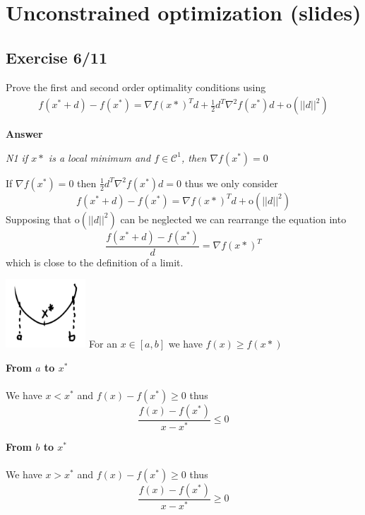\section{Unconstrained optimization (slides)}
\subsection{Exercise 6/11}
Prove the first and second order optimality conditions using
\begin{align*}
f(x^* + d) - f(x^*) = \nabla f(x*)^T d + \frac{1}{2} d^T \nabla^2 f(x^*)d + \text{o}(||d||^2)
\end{align*}

\textbf{Answer}

\hspace{0.5in} \textit{N1 if $x*$ is a local minimum and $f\in \mathcal{C}^1$, then $\nabla f(x^*) = 0$}

If $\nabla f(x^*) = 0$ then $\frac{1}{2} d^T \nabla^2 f(x^*)d = 0$ thus we only consider
\[
f(x^* + d) - f(x^*) = \nabla f(x*)^T d + \text{o}(||d||^2)
\]
Supposing that $\text{o}(||d||^2)$ can be neglected we can rearrange the equation into
\[
\frac{f(x^* + d) - f(x^*)}{d} = \nabla f(x*)^T
\]
which is close to the definition of a limit.

\includegraphics[width=3cm]{fig/unconstrained/6_11.png} For an $x \in [a, b]$ we have $f(x) \geq f(x*)$

\begin{minipage}[t]{.5\textwidth}
  \textbf{From $a$ to $x^*$}\\
  \\
  We have $x < x^*$ and $f(x) - f(x^*) \geq 0$ thus
  \[
  	\frac{f(x) - f(x^*)}{x - x^*} \leq 0
  \]
\end{minipage}
\hspace{0.025\textwidth}\vline\hspace{0.025\textwidth}
\begin{minipage}[t]{.5\textwidth}
  \textbf{From $b$ to $x^*$}\\
  \\
  We have $x > x^*$ and $f(x) - f(x^*) \geq 0$ thus
  \[
  	\frac{f(x) - f(x^*)}{x - x^*} \geq 0
  \]
\end{minipage}

